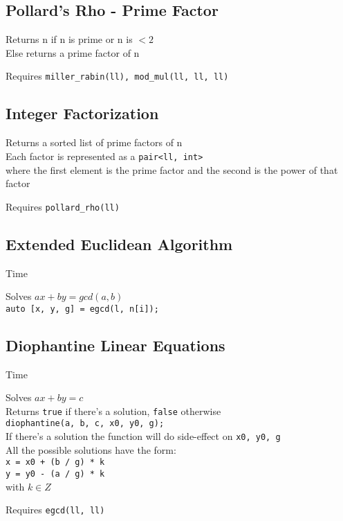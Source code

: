 \subsection{Pollard's Rho - Prime Factor}
Returns n if n is prime or n is $< 2$ \\
Else returns a prime factor of n

Requires \verb|miller_rabin(ll), mod_mul(ll, ll, ll)|



\subsection{Integer Factorization}
Returns a sorted list of prime factors of n \\
Each factor is represented as a \verb|pair<ll, int>| \\
where the first element is the prime factor and the second is the power of that factor

Requires \verb|pollard_rho(ll)|



\subsection{Extended Euclidean Algorithm}
 Time

Solves $ax + by = gcd(a, b)$ \\
\verb|auto [x, y, g] = egcd(l, n[i]);|



\subsection{Diophantine Linear Equations}
 Time

Solves $ax + by = c$ \\
Returns \verb|true| if there's a solution, \verb|false| otherwise \\
\verb|diophantine(a, b, c, x0, y0, g);| \\
If there's a solution the function will do side-effect on \verb|x0, y0, g|\\
All the possible solutions have the form: \\
\verb|x = x0 + (b / g) * k| \\
\verb|y = y0 - (a / g) * k| \\
with $k \in Z$

Requires \verb|egcd(ll, ll)|



